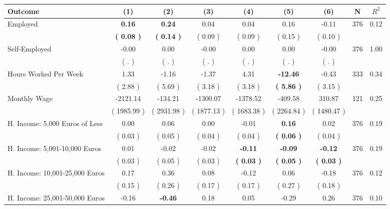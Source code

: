 \begin{tabular}{lcccccccc}
\toprule
 \textbf{Outcome} & \textbf{(1)} & \textbf{(2)} & \textbf{(3)} & \textbf{(4)} & \textbf{(5)} & \textbf{(6)} & \textbf{N} & \textbf{$ R^2$} \\
\midrule
Employed & \textbf{     0.16} & \textbf{     0.24} &      0.04 &      0.04 &      0.16 &     -0.11 & 376 &       0.12 \\ 
 & \textbf{(     0.08 )} & \textbf{(     0.14 )} & (     0.09 ) & (     0.09 ) & (     0.15 ) & (     0.10 ) & \\
Self-Employed &     -0.00 &      0.00 &     -0.00 &      0.00 &      0.00 &     -0.00 & 376 &       1.00 \\ 
 & (        . ) & (        . ) & (        . ) & (        . ) & (        . ) & (        . ) & \\
Hours Worked Per Week &      1.33 &     -1.16 &     -1.37 &      4.31 & \textbf{   -12.46} &     -0.43 & 333 &       0.34 \\ 
 & (     2.88 ) & (     5.69 ) & (     3.18 ) & (     3.18 ) & \textbf{(     5.86 )} & (     3.15 ) & \\
Monthly Wage &  -2121.14 &   -134.21 &  -1300.07 &  -1378.52 &   -409.58 &    310.87 & 121 &       0.25 \\ 
 & (  1985.99 ) & (  2931.98 ) & (  1877.13 ) & (  1683.38 ) & (  2264.84 ) & (  1480.47 ) & \\
H. Income: 5,000 Euros of Less &      0.00 &      0.06 &      0.00 &     -0.01 & \textbf{     0.16} &      0.02 & 376 &       0.19 \\ 
 & (     0.03 ) & (     0.05 ) & (     0.04 ) & (     0.04 ) & \textbf{(     0.06 )} & (     0.04 ) & \\
H. Income: 5,001-10,000 Euros &      0.01 &     -0.02 &     -0.02 & \textbf{    -0.11} & \textbf{    -0.09} & \textbf{    -0.12} & 376 &       0.19 \\ 
 & (     0.03 ) & (     0.05 ) & (     0.03 ) & \textbf{(     0.03 )} & \textbf{(     0.05 )} & \textbf{(     0.03 )} & \\
H. Income: 10,001-25,000 Euros &      0.17 &      0.36 &      0.08 &     -0.12 &      0.06 &     -0.18 & 376 &       0.12 \\ 
 & (     0.15 ) & (     0.26 ) & (     0.17 ) & (     0.17 ) & (     0.27 ) & (     0.18 ) & \\
H. Income: 25,001-50,000 Euros &     -0.16 & \textbf{    -0.46} &      0.18 &      0.05 &     -0.29 &      0.26 & 376 &       0.10 \\ 

\end{tabular}
